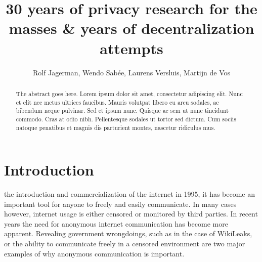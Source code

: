 \documentclass[journal]{IEEEtran}
\begin{document}


\title{30 years of privacy research for the masses \&  years of decentralization attempts}
\author{Rolf Jagerman, Wendo Sab\'ee, Laurens Versluis, Martijn de Vos}


\maketitle

\begin{abstract}
	The abstract goes here. Lorem ipsum dolor sit amet, consectetur adipiscing elit. Nunc et elit nec metus ultrices faucibus. Mauris volutpat libero eu arcu sodales, ac bibendum neque pulvinar. Sed et ipsum nunc. Quisque ac sem ut nunc tincidunt commodo. Cras at odio nibh. Pellentesque sodales ut tortor sed dictum. Cum sociis natoque penatibus et magnis dis parturient montes, nascetur ridiculus mus. 
\end{abstract}


\section{Introduction}
	 the introduction and commercialization of the internet in 1995, it has become an important tool for anyone to freely and easily communicate. In many cases however, internet usage is either censored or monitored by third parties. In recent years the need for anonymous internet communication has become more apparent. Revealing government wrongdoings, such as in the case of WikiLeaks, or the ability to communicate freely in a censored environment are two major examples of why anonymous communication is important.
	
\end{document}
